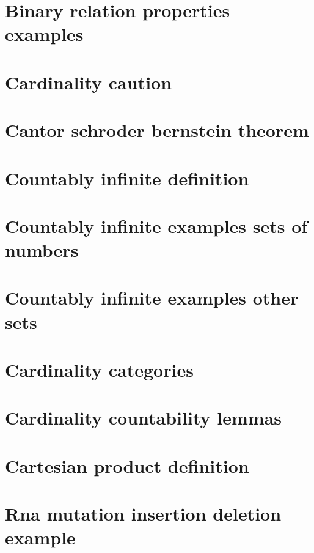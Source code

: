 \section*{Binary relation properties examples}

\vfill
\section*{Cardinality caution}

\vfill
\section*{Cantor schroder bernstein theorem}

\vfill
\section*{Countably infinite definition}

\vfill
\section*{Countably infinite examples sets of numbers}

\vfill
\section*{Countably infinite examples other sets}

\vfill
\section*{Cardinality categories}

\vfill
\section*{Cardinality countability lemmas}

\vfill
\section*{Cartesian product definition}

\vfill
\section*{Rna mutation insertion deletion example}

\vfill
